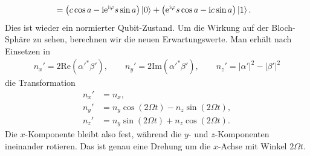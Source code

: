 \documentclass[11pt,a4paper]{scrartcl}
\newcommand{\e}{\mathrm e}
\newcommand{\ii}{\mathrm i}
\begin{document}
\begin{enumerate}[label=(\alph*)]
\begin{calculationbox}
\begin{calculationbox}[title=Zeitentwicklung um die $x$-Achse]
\begin{align*}
                    &=
                    \left(c\cos a-\ii\e^{\ii\varphi}s\sin a\right)\ket{0}
                    +
                    \left(\e^{\ii\varphi}s\cos a-\ii c\sin a\right)\ket{1}.
                \end{align*}
                Dies ist wieder ein normierter Qubit-Zustand. Um die Wirkung auf der Bloch-Sphäre zu sehen, berechnen wir die neuen Erwartungswerte. Man erhält nach Einsetzen in
                \begin{align*}
                    n_x'=2\mathrm{Re}(\alpha'^*\beta'),
                    \qquad
                    n_y'=2\mathrm{Im}(\alpha'^*\beta'),
                    \qquad
                    n_z'=|\alpha'|^2-|\beta'|^2
                \end{align*}
                die Transformation
                \begin{align*}
                    n_x'&=n_x,\\
                    n_y'&=n_y\cos(2\Omega t)-n_z\sin(2\Omega t),\\
                    n_z'&=n_y\sin(2\Omega t)+n_z\cos(2\Omega t).
                \end{align*}
                Die $x$-Komponente bleibt also fest, während die $y$- und $z$-Komponenten ineinander rotieren. Das ist genau eine Drehung um die $x$-Achse mit Winkel $2\Omega t$.
            \end{calculationbox}


\end{calculationbox}
\end{enumerate}
\end{document}
